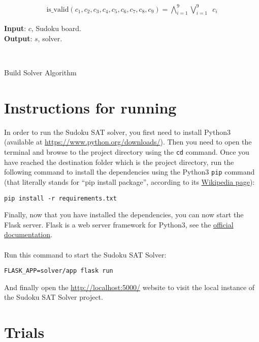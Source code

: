\documentclass[]{usiinfprospectus}
\newcounter{row}
\begin{document}
\begin{align*}
\text{is\_valid}\left(  c_1,  c_2,  c_3,  c_4,  c_5,  c_6,  c_7,  c_8,  c_9  \right) = \bigwedge^9_{i=1}  \bigvee^9_{i=1} \,\,\, c_i
\end{align*}

\begin{algorithm}[H]
\hspace*{\algorithmicindent} \textbf{Input}: $c$, Sudoku board. \\
\hspace*{\algorithmicindent} \textbf{Output}: $s$, solver. 
\begin{algorithmic}[1]\label{algorithm:}
 
\Else
{}
\EndIf
\EndFor
{}
\EndFor
{}
\EndFor\\
\EndFunction
\end{algorithmic}
\caption {Build Solver Algorithm}
\end{algorithm}

\newpage
\section{Instructions for running}

In order to run the Sudoku SAT solver, you first need to install Python3 (available at \url{https://www.python.org/downloads/}). Then you need to open the terminal and browse to the project directory using the \texttt{cd}
command. Once you have reached the destination folder which is the project directory, run the following command to install the dependencies using the Python3 \texttt{pip} command (that literally stands for ``pip install package'', according to its \href{https://en.wikipedia.org/wiki/Pip\_(package\_manager)}{Wikipedia page}):

\begin{center}
\texttt{pip install -r requirements.txt}
\end{center}

\noindent
Finally, now that you have installed the dependencies, you can now start the Flask server. Flask is a web server framework for Python3, see the \href{https://flask.palletsprojects.com/}{official documentation}.\\ \\
Run this command to start the Sudoku SAT Solver:

\begin{center}
\texttt{FLASK\_APP=solver/app flask run}
\end{center}

\noindent
And finally open the \url{http://localhost:5000/} website to visit the local
instance of the Sudoku SAT Solver project.


\section{Trials} \label{trials}


\end{document}
